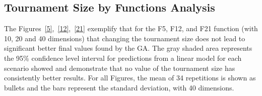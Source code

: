 \subsection{Tournament Size by Functions Analysis}
The Figures~\ref{5},~\ref{12},~\ref{21} exemplify that for the F5, F12, and F21 function (with 10, 20 and 40 dimensions) that changing the tournament size does not lead to significant better final values found by the GA. The gray shaded area represents the 95\% confidence level interval for predictions from a linear model for each scenario showed and demonstrate that no value of the tournament size has consistently better results. For all Figures, the mean of 34 repetitions is shown as bullets and the bars represent the standard deviation, with 40 dimensions. 


